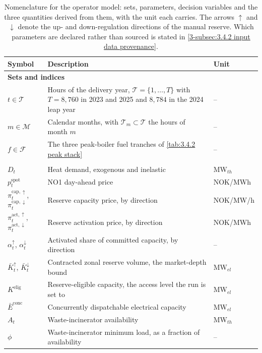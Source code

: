 \begin{table}[!htbp]
\centering
\caption{Nomenclature for the operator model: sets, parameters, decision variables and the three quantities derived from them, with the unit each carries. The arrows $\uparrow$ and $\downarrow$ denote the up- and down-regulation directions of the manual reserve. Which parameters are declared rather than sourced is stated in \autoref{3-subsec:3.4.2 input data provenance}.}
\footnotesize
\renewcommand{\arraystretch}{1.18}
\begin{tabular}{p{2.4cm} p{8.9cm} p{2.3cm}}
\toprule
\textbf{Symbol} & \textbf{Description} & \textbf{Unit} \\
\midrule
\multicolumn{3}{l}{\textbf{Sets and indices}} \\
$t \in \mathcal{T}$ & Hours of the delivery year, $\mathcal{T} = \{1, \dots, T\}$ with $T = 8{,}760$ in 2023 and 2025 and $8{,}784$ in the 2024 leap year & -- \\
$m \in \mathcal{M}$ & Calendar months, with $\mathcal{T}_m \subset \mathcal{T}$ the hours of month $m$ & -- \\
$f \in \mathcal{F}$ & The three peak-boiler fuel tranches of \autoref{tab:3.4.2 peak stack} & -- \\
\addlinespace
\multicolumn{3}{l}{\textbf{Parameters}} \\
$D_t$ & Heat demand, exogenous and inelastic & MW$_{th}$ \\
$p^{\text{spot}}_t$ & NO1 day-ahead price & NOK/MWh \\
$\pi^{\text{cap},\uparrow}_t$, $\pi^{\text{cap},\downarrow}_t$ & Reserve capacity price, by direction & NOK/MW/h \\
$\pi^{\text{act},\uparrow}_t$, $\pi^{\text{act},\downarrow}_t$ & Reserve activation price, by direction & NOK/MWh \\
$\alpha^{\uparrow}_t$, $\alpha^{\downarrow}_t$ & Activated share of committed capacity, by direction & -- \\
$\bar{K}^{\uparrow}_t$, $\bar{K}^{\downarrow}_t$ & Contracted zonal reserve volume, the market-depth bound & MW$_{el}$ \\
$K^{\text{elig}}$ & Reserve-eligible capacity, the access level the run is set to & MW$_{el}$ \\
$\bar{E}^{\text{conc}}$ & Concurrently dispatchable electrical capacity & MW$_{el}$ \\
$A_t$ & Waste-incinerator availability & MW$_{th}$ \\
$\phi$ & Waste-incinerator minimum load, as a fraction of availability & -- \\

\end{tabular}
\end{table}
